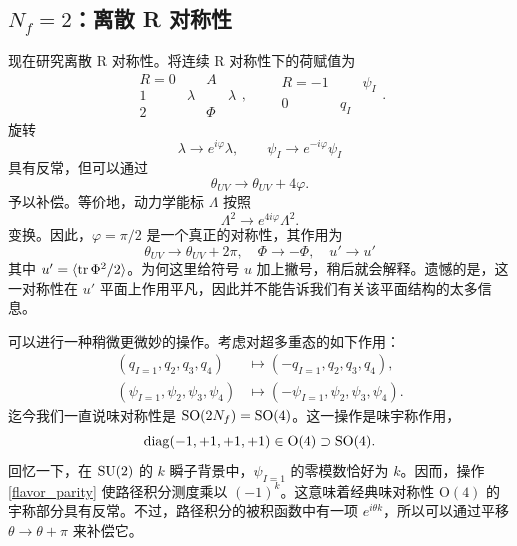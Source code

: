 \subsection{$N_f=2$：离散 R 对称性}
现在研究离散 R 对称性。将连续 R 对称性下的荷赋值为
\begin{equation}
\begin{array}{r|ccc}
R=0&&A\\1&\lambda&&\lambda\\2&&\Phi
\end{array},\qquad
\begin{array}{r|ccc}
R=-1&&\psi_I\\0&q_I&
\end{array}.
\end{equation}
旋转
\begin{equation}
\lambda\to e^{i\varphi}\lambda,\qquad
\psi_I\to e^{-i\varphi}\psi_I\label{nf_2_shiftx}
\end{equation}
具有反常，但可以通过
\begin{equation}
\theta_{UV}\to\theta_{UV}+4\varphi.\label{nf_2_shift}
\end{equation}
予以补偿。等价地，动力学能标 $\Lambda$ 按照
\begin{equation}
\Lambda^2\to e^{4i\varphi}\Lambda^2.
\end{equation}
变换。因此，$\varphi=\pi/2$ 是一个真正的对称性，其作用为
\begin{equation}
\theta_{UV}\to\theta_{UV}+2\pi,\quad
\Phi\to-\Phi,\quad
u'\to u'
\end{equation}
其中 $u'=\langle\mathop{\mathrm{tr}}\nolimits\Phi^2/2\rangle$。为何这里给符号 $u$ 加上撇号，稍后就会解释。遗憾的是，这一对称性在 $u'$ 平面上作用平凡，因此并不能告诉我们有关该平面结构的太多信息。

可以进行一种稍微更微妙的操作。考虑对超多重态的如下作用：
\begin{align}
(q_{I=1},q_2,q_3,q_4)&\mapsto(-q_{I=1},q_2,q_3,q_4),\\
(\psi_{I=1},\psi_2,\psi_3,\psi_4)&\mapsto(-\psi_{I=1},\psi_2,\psi_3,\psi_4).\label{flavor_parity}
\end{align}
迄今我们一直说味对称性是 $\mathop{\mathrm{SO}}(2N_f)=\mathop{\mathrm{SO}}(4)$。这一操作是味宇称作用，
\begin{equation}
\mathop{\mathrm{diag}}(-1,+1,+1,+1)\in\mathrm{O}(4)\supset\mathop{\mathrm{SO}}(4).
\end{equation}
回忆一下，在 $\mathop{\mathrm{SU}}(2)$ 的 $k$ 瞬子背景中，$\psi_{I=1}$ 的零模数恰好为 $k$。因而，操作 \eqref{flavor_parity} 使路径积分测度乘以 $(-1)^k$。这意味着经典味对称性 $\mathrm{O}(4)$ 的宇称部分具有反常。不过，路径积分的被积函数中有一项 $e^{i\theta k}$，所以可以通过平移 $\theta\to\theta+\pi$ 来补偿它。

